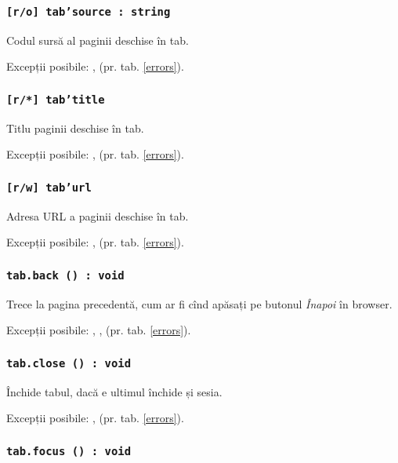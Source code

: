 \subsubsection{\texttt{[r/o] tab'source : string}}

Codul sursă al paginii deschise în tab.

Excepții posibile: ,  (pr. tab. \ref{errors}).

\subsubsection{\texttt{[r/*] tab'title}}

Titlu paginii deschise în tab.

Excepții posibile: ,  (pr. tab. \ref{errors}).

\subsubsection{\texttt{[r/w] tab'url}}

Adresa URL a paginii deschise în tab.

Excepții posibile: ,  (pr. tab. \ref{errors}).

\subsubsection{\texttt{tab.back () : void}}

Trece la pagina precedentă, cum ar fi cînd apăsați pe butonul \textit{Înapoi} în browser.

Excepții posibile: , ,  (pr. tab. \ref{errors}).

\subsubsection{\texttt{tab.close () : void}}

Închide tabul, dacă e ultimul închide și sesia.

Excepții posibile: ,  (pr. tab. \ref{errors}).

\subsubsection{\texttt{tab.focus () : void}}

